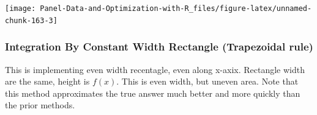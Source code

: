 \documentclass[
]{book}
\begin{document}
\begin{center}\texttt{[image: Panel-Data-and-Optimization-with-R\_files/figure-latex/unnamed-chunk-163-3]} \end{center}

\hypertarget{integration-by-constant-width-rectangle-trapezoidal-rule}{%
\subsubsection{Integration By Constant Width Rectangle (Trapezoidal rule)}\label{integration-by-constant-width-rectangle-trapezoidal-rule}}

This is implementing even width recentagle, even along x-axix. Rectangle width are the same, height is \(f(x)\). This is even width, but uneven area. Note that this method approximates the true answer much better and more quickly than the prior methods.
\end{document}
